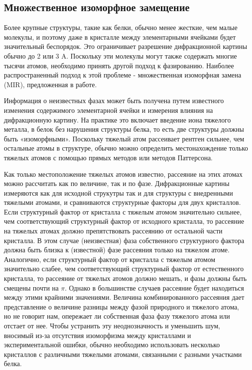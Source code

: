 \documentclass{article}
\begin{document}
\subsection{Множественное изоморфное замещение}
Более крупные структуры, такие как белки, обычно менее жесткие, чем малые молекулы, и поэтому даже в кристалле между элементарными ячейками будет значительный беспорядок. Это ограничивает разрешение дифракционной картины обычно до 2 или 3 A. Поскольку эти молекулы могут также содержать многие тысячи атомов, необходимо принять другой подход к фазированию. Наиболее распространенный подход к этой проблеме - множественная изоморфная замена (MIR), предложенная в работе\cite{PERUTZ1960}.

Информация о неизвестных фазах может быть получена путем известного изменения содержимого элементарной ячейки и измерения влияния на дифракционную картину. На практике это включает введение иона тяжелого металла, в белок без нарушения структуры белка, то есть две структуры должны быть «изоморфными». Поскольку тяжелый атом рассеивает рентген сильнее, чем остальные атомы в структуре, обычно можно определить местонахождение только тяжелых атомов с помощью прямых методов или методов Паттерсона.

Как только местоположение тяжелых атомов известно, рассеяние на этих атомах можно рассчитать как по величине, так и по фазе. Дифракционные картины измеряются как для исходной струкутры так и для структуры с внедренными тяжелыми атомами, и сравниваются структурные факторы для двух кристаллов. Если структурный фактор от кристалла с тяжелым атомом значительно сильнее, чем соответствующий структурный фактор от исходного кристалла, то рассеяние на тяжелых атомах должно препятствовать рассеянию от остальной части кристалла. В этом случае (неизвестная) фаза собственного структурного фактора должна быть близка к (известной) фазе рассеяния только на тяжелом атоме.
Аналогично, если структурный фактор от кристалла с тяжелым атомом значительно слабее, чем соответствующий структурный фактор от естественного кристалла, то рассеяние от тяжелых атомов должно мешать, и фазы должны быть смещены почти на $\pi$. Однако в большинстве случаев рассеяние будет находиться между этими крайними значениями. Величина комбинированного рассеяния дает представление о величине разницы между фазой природного и тяжелого атома, но не говорит нам, опережает ли собственная фаза фазу тяжелого атома или отстает от нее. Чтобы устранить эту неоднозначность и уменьшить шум, вносимый из-за отсутствия изоморфизма между кристаллами и экспериментальной ошибки, обычно необходимо использовать несколько кристаллов с различными тяжелыми атомами, связанными с разными участками белка\cite{ProtXR}.
\end{document}
